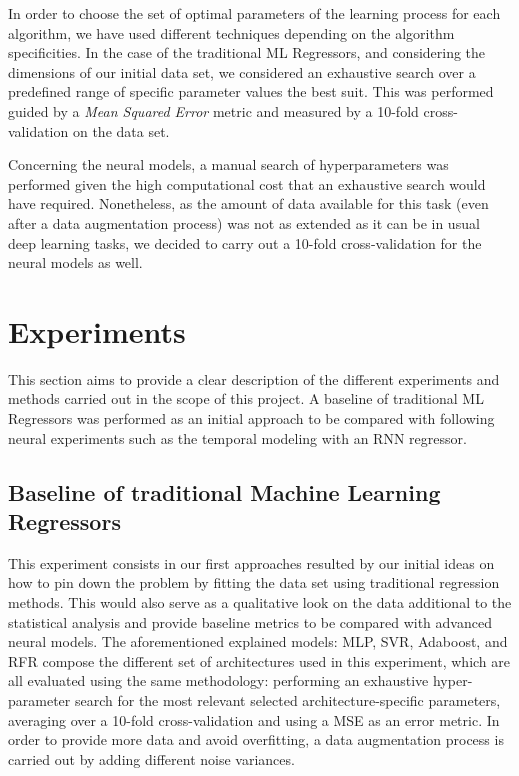 \documentclass[anon]{CI}
\begin{document}
In order to choose the set of optimal parameters of the learning process for each algorithm, we have used different techniques depending on the algorithm specificities. In the case of the traditional ML Regressors, and considering the dimensions of our initial data set, we considered an exhaustive search over a predefined range of specific parameter values the best suit. This was performed guided by a \textit{Mean Squared Error} metric and measured by a 10-fold cross-validation on the data set.

    Concerning the neural models, a manual search of hyperparameters was performed given the high computational cost that an exhaustive search would have required. Nonetheless, as the amount of data available for this task (even after a data augmentation process) was not as extended as it can be in usual deep learning tasks, we decided to carry out a 10-fold cross-validation for the neural models as well.

\section{Experiments}

This section aims to provide a clear description of the different experiments and methods carried out in the scope of this project. A baseline of traditional ML Regressors was performed as an initial approach to be compared with following neural experiments such as the temporal modeling with an RNN regressor.

\subsection{Baseline of traditional Machine Learning Regressors}

This experiment consists in our first approaches resulted by our initial ideas on how to pin down the problem by fitting the data set using traditional regression methods. This would also serve as a qualitative look on the data additional to the statistical analysis and provide baseline metrics to be compared with advanced neural models. The aforementioned explained models: MLP, SVR, Adaboost, and RFR compose the different set of architectures used in this experiment, which are all evaluated using the same methodology: performing an exhaustive hyper-parameter search for the most relevant selected architecture-specific parameters, averaging over a 10-fold cross-validation and using a MSE as an error metric. In order to provide more data and avoid overfitting, a data augmentation process is carried out by adding different noise variances.
\end{document}
